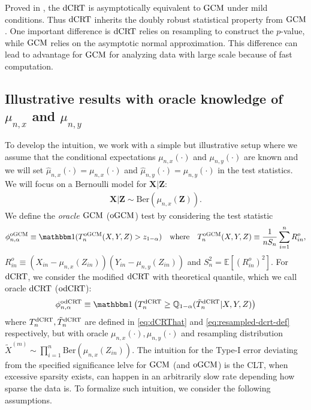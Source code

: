 \documentclass[12pt]{article}
\theoremstyle{definition}
\newcommand{\E}{\mathbb E}								%
\newcommand{\Q}{\mathbb{Q}}								%
\newcommand{\indicator}{\mathbbm 1}						%
\newcommand{\prx}{\bm X}								%
\newcommand{\srx}{X}									%
\newcommand{\prz}{\bm Z}								%
\newcommand{\srz}{Z}									%
\newcommand{\sry}{Y}									%
\newcommand{\dCRT}{\textnormal{dCRT}} 					%
\newcommand{\odCRT}{\textnormal{odCRT}} 					%
\newcommand{\GCM}{\textnormal{GCM}}						%
\newcommand{\oGCM}{\textnormal{oGCM}}						%
\begin{document}
Proved in \citet{Niu2022a}, the $\dCRT$ is asymptotically equivalent to $\GCM$ under mild conditions. Thus $\dCRT$ inherits the doubly robust statistical property from $\GCM$. One important difference is $\dCRT$ relies on resampling to construct the $p$-value, while $\GCM$ relies on the asymptotic normal approximation. This difference can lead to advantage for $\GCM$ for analyzing data with large scale because of fast computation. 

\subsection{Illustrative results with oracle knowledge of $\mu_{n,x}$ and $\mu_{n,y}$}\label{sec:finite_sample}

To develop the intuition, we work with a simple but illustrative setup where we assume that the conditional expectations $\mu_{n,x}(\cdot)$ and $\mu_{n,y}(\cdot)$ are known and we will set $\widehat{\mu}_{n,x}(\cdot) = \mu_{n,x}(\cdot)$ and $\widehat{\mu}_{n,y}(\cdot) = \mu_{n,y}(\cdot)$ in the test statistics. We will focus on a Bernoulli model for $\prx|\prz$:
\begin{align}\label{eq:illustrative_bernoulli}
  \prx|\prz\sim \mathrm{Ber}(\mu_{n,x}(\prz)).
\end{align}
We define the \textit{oracle $\GCM$} ($\oGCM$) test by considering the test statistic 
\begin{align}\label{eq:oGCM}
  \phi_{n,\alpha}^{\oGCM}\equiv \indicator(T_n^{\oGCM}(\srx,\sry,\srz)>z_{1-\alpha})\quad\text{where}\quad T_{n}^{\oGCM}(\srx,\sry,\srz)\equiv\frac{1}{nS_n}\sum_{i=1}^{n}R_{in}^o,
\end{align}
$R_{in}^o\equiv(\srx_{in}-\mu_{n,x}(\srz_{in}))(\sry_{in}-\mu_{n,y}(\srz_{in}))$
and $S_n^2=\E[(R_{in}^o)^2]$. For $\dCRT$, we consider the modified $\dCRT$ with theoretical quantile, which we call oracle $\dCRT$ ($\odCRT$):
\begin{align*}
  \phi^{\odCRT}_{n,\alpha}\equiv \indicator\left(T_n^{\dCRT}\geq \Q_{1-\alpha}(\tilde T_{n}^{\dCRT}|\srx,\sry,\srz)\right)
\end{align*}
where $T_n^{\dCRT},\tilde T_{n}^{\dCRT}$ are defined in \eqref{eq:dCRThat} and \eqref{eq:resampled-dcrt-def} respectively, but with oracle $\mu_{n,x}(\cdot),\mu_{n,y}(\cdot)$ and resampling distribution $\widetilde{X}^{(m)}\sim \prod_{i=1}^n \mathrm{Ber}(\mu_{n,x}(\srz_{in}))$. The intuition for the Type-I error deviating from the specified significance lelve for $\GCM$ (and $\oGCM$) is the CLT, when excessive sparsity exists, can happen in an arbitrarily slow rate depending how sparse the data is. To formalize such intuition, we consider the following assumptions.
\end{document}
